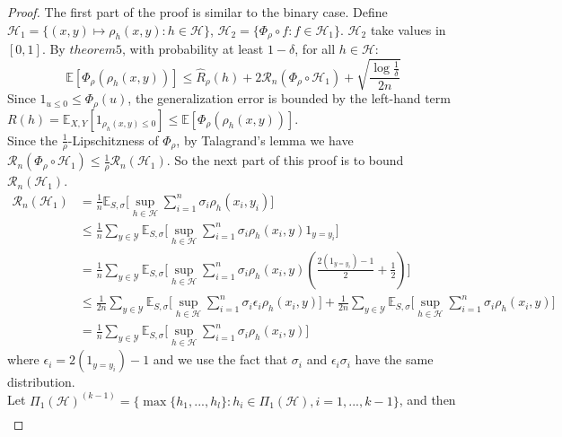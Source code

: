 \begin{proof}
	The first part of the proof is similar to the binary case. Define $\mathcal{H}_1=\{(x,y)\mapsto \rho_h(x,y) : h \in \mathcal{H} \}$, $\mathcal{H}_2 = \{\Phi_{\rho}\circ f : f\in \mathcal{H}_1\}$. $\mathcal{H}_2$ take values in $[0,1]$. By $theorem5$, with probability at least $1-\delta$, for all $h \in \mathcal{H}$:
	\begin{equation}
	\mathbb{E}[\Phi_{\rho}(\rho_h(x,y))] \leq \hat{R}_\rho (h) + 2\mathcal{R}_n(\Phi_{\rho}\circ \mathcal{H}_1) + \sqrt{\frac{\log\frac{1}{\delta}}{2n}}
	\end{equation}
	Since $1_{u\leq 0} \leq \Phi_{\rho}(u)$, the generalization error is bounded by the left-hand term $R(h) = \mathbb{E}_{X,Y}[1_{\rho_h(x, y) \leq 0}] \leq \mathbb{E}[\Phi_{\rho}(\rho_h(x,y))]$.\\
	Since the $\frac{1}{\rho}$-Lipschitzness of $\Phi_{\rho}$, by Talagrand's lemma we have $\mathcal{R}_n(\Phi_{\rho}\circ \mathcal{H}_1) \leq \frac{1}{\rho} \mathcal{R}_n(\mathcal{H}_1)$. So the next part of this proof is to bound $\mathcal{R}_n(\mathcal{H}_1)$.
	\begin{align}
	\mathcal{R}_n(\mathcal{H}_1) &= \frac{1}{n} \mathbb{E}_{S,\sigma}\bigg[\sup_{h \in \mathcal{H}}\sum_{i=1}^{n}\sigma_i\rho_h(x_i,y_i)\bigg] \\
	&\leq\frac{1}{n}\sum_{y\in\mathcal{Y}}\mathbb{E}_{S,\sigma}\bigg[\sup_{h \in \mathcal{H}}\sum_{i=1}^{n}\sigma_i\rho_h(x_i,y)1_{y=y_i}\bigg]\\
	&=  \frac{1}{n}\sum_{y\in \mathcal{Y}}\mathbb{E}_{S,\sigma}\bigg[\sup_{h \in \mathcal{H}}\sum_{i=1}^{n}\sigma_i\rho_h(x_i,y)(\frac{2(1_{y=y_i})-1}{2} + \frac{1}{2}) \bigg]\\
	&\leq \frac{1}{2n}\sum_{y\in\mathcal{Y}}\mathbb{E}_{S,\sigma}\bigg[\sup_{h \in \mathcal{H}}\sum_{i=1}^{n}\sigma_i\epsilon_i \rho_h(x_i,y)\bigg] + \frac{1}{2n}\sum_{y\in\mathcal{Y}}\mathbb{E}_{S,\sigma}\bigg[\sup_{h \in \mathcal{H}}\sum_{i=1}^{n}\sigma_i \rho_h(x_i,y)\bigg]\\
	&= \frac{1}{n}\sum_{y\in\mathcal{Y}}\mathbb{E}_{S,\sigma}\bigg[\sup_{h \in \mathcal{H}}\sum_{i=1}^{n}\sigma_i \rho_h(x_i,y)\bigg]
	\end{align} 
	where $\epsilon_i=2(1_{y=y_i})-1$ and we use the fact that $\sigma_i$ and $\epsilon_i\sigma_i$ have the same distribution.\\
	Let $\Pi_1(\mathcal{H})^{(k-1)} = \{\max\{h_1,...,h_l\} : h_i \in \Pi_1(\mathcal{H}), i=1,...,k-1 \}$, and then
	\begin{align}

\end{align}
\end{proof}
